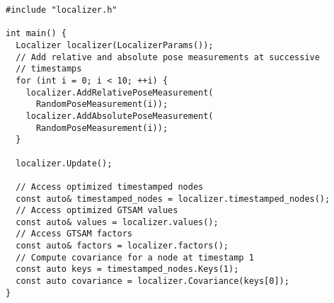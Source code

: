 \begin{verbatim}
#include "localizer.h"

int main() {
  Localizer localizer(LocalizerParams());
  // Add relative and absolute pose measurements at successive
  // timestamps
  for (int i = 0; i < 10; ++i) {
    localizer.AddRelativePoseMeasurement(
      RandomPoseMeasurement(i));
    localizer.AddAbsolutePoseMeasurement(
      RandomPoseMeasurement(i));
  }

  localizer.Update();

  // Access optimized timestamped nodes
  const auto& timestamped_nodes = localizer.timestamped_nodes();
  // Access optimized GTSAM values
  const auto& values = localizer.values();
  // Access GTSAM factors
  const auto& factors = localizer.factors();
  // Compute covariance for a node at timestamp 1
  const auto keys = timestamped_nodes.Keys(1);
  const auto covariance = localizer.Covariance(keys[0]);
}
\end{verbatim}